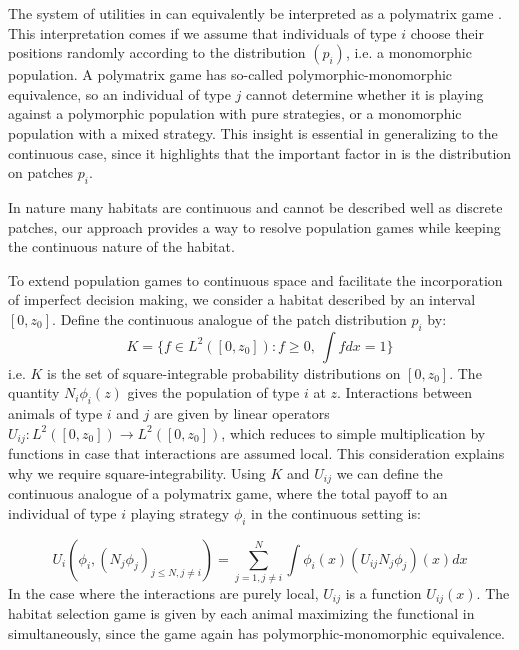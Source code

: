 

The system of utilities in  can equivalently be interpreted as a polymatrix game \citep{howson1972equilibria}. This interpretation comes if we assume that individuals of type $i$ choose their positions randomly according to the distribution $(p_i)$, i.e. a monomorphic population. A polymatrix game has so-called polymorphic-monomorphic equivalence, so an individual of type $j$ cannot determine whether it is playing against a polymorphic population with pure strategies, or a monomorphic population with a mixed strategy. This insight is essential in generalizing to the continuous case, since it highlights that the important factor in  is the distribution on patches $p_i$.

In nature many habitats are continuous and cannot be described well as discrete patches, our approach provides a way to resolve population games while keeping the continuous nature of the habitat.

To extend population games to continuous space and facilitate the incorporation of imperfect decision making, we consider a habitat described by an interval $[0,z_0]$. Define the continuous analogue of the patch distribution $p_i$ by:
\begin{equation}
  K = \{ f \in L^2([0,z_0]) : f \geq 0,~\int f dx = 1\}
  \label{def:space_of_dists}
\end{equation}
i.e. $K$ is the set of square-integrable probability distributions on $[0,z_0]$. The quantity $N_i \phi_i(z)$ gives the population of type $i$ at $z$. Interactions between animals of type $i$ and $j$ are given by linear operators $U_{ij}: L^2([0,z_0]) \to L^2([0,z_0])$, which reduces to simple multiplication by functions in case that interactions are assumed local. This consideration explains why we require square-integrability. Using $K$ and $U_{ij}$ we can define the continuous analogue of a polymatrix game, where the total payoff to an individual of type $i$ playing strategy $\phi_i$ in the continuous setting is:

\begin{equation}
  U_i(\phi_i, (N_j \phi_j)_{j \leq N, j \neq i}) = \sum_{j=1,j\neq i}^N \int \phi_i(x) (U_{ij}N_j \phi_j)(x) dx%
  \label{eq:utility}
\end{equation}
In the case where the interactions are purely local, $U_{ij}$ is a function $U_{ij}(x)$. The habitat selection game is given by each animal maximizing the functional in  simultaneously, since the game again has polymorphic-monomorphic equivalence.

